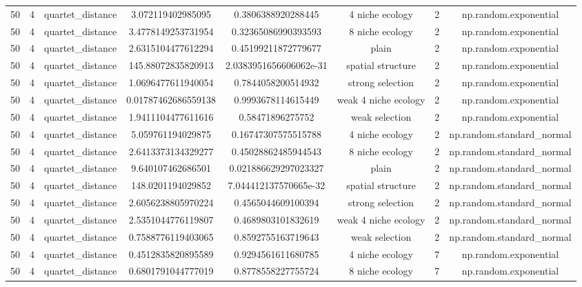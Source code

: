 \begin{longtable}{||c c c c c c c c||}
        50 & 4 & quartet\_distance & 3.072119402985095 & 0.3806388920288445 & 4 niche ecology & 2 & np.random.exponential \\ 
        50 & 4 & quartet\_distance & 3.4778149253731954 & 0.32365086990393593 & 8 niche ecology & 2 & np.random.exponential \\ 
        50 & 4 & quartet\_distance & 2.6315104477612294 & 0.45199211872779677 & plain & 2 & np.random.exponential \\ 
        50 & 4 & quartet\_distance & 145.88072835820913 & 2.0383951656606062e-31 & spatial structure & 2 & np.random.exponential \\ 
        50 & 4 & quartet\_distance & 1.0696477611940054 & 0.7844058200514932 & strong selection & 2 & np.random.exponential \\ 
        50 & 4 & quartet\_distance & 0.01787462686559138 & 0.9993678114615449 & weak 4 niche ecology & 2 & np.random.exponential \\ 
        50 & 4 & quartet\_distance & 1.9411104477611616 & 0.58471896275752 & weak selection & 2 & np.random.exponential \\ 
        50 & 4 & quartet\_distance & 5.059761194029875 & 0.16747307575515788 & 4 niche ecology & 2 & np.random.standard\_normal \\ 
        50 & 4 & quartet\_distance & 2.6413373134329277 & 0.45028862485944543 & 8 niche ecology & 2 & np.random.standard\_normal \\ 
        50 & 4 & quartet\_distance & 9.640107462686501 & 0.021886629297023327 & plain & 2 & np.random.standard\_normal \\ 
        50 & 4 & quartet\_distance & 148.0201194029852 & 7.044412137570665e-32 & spatial structure & 2 & np.random.standard\_normal \\ 
        50 & 4 & quartet\_distance & 2.6056238805970224 & 0.4565044609100394 & strong selection & 2 & np.random.standard\_normal \\ 
        50 & 4 & quartet\_distance & 2.5351044776119807 & 0.4689803101832619 & weak 4 niche ecology & 2 & np.random.standard\_normal \\ 
        50 & 4 & quartet\_distance & 0.7588776119403065 & 0.8592755163719643 & weak selection & 2 & np.random.standard\_normal \\ 
        50 & 4 & quartet\_distance & 0.4512835820895589 & 0.9294561611680785 & 4 niche ecology & 7 & np.random.exponential \\ 
        50 & 4 & quartet\_distance & 0.6801791044777019 & 0.8778558227755724 & 8 niche ecology & 7 & np.random.exponential \\ 

\end{longtable}

